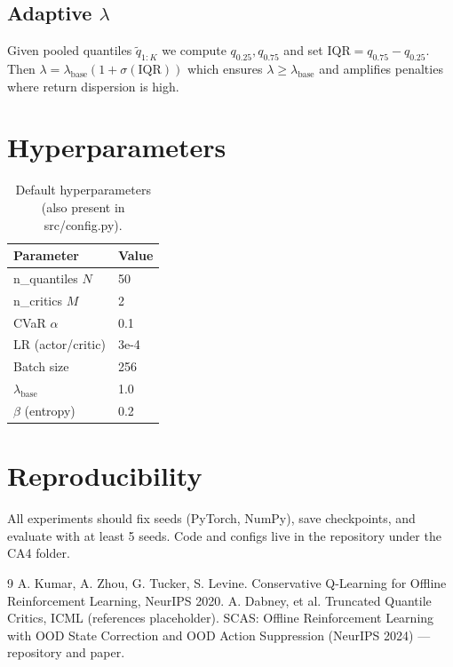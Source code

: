 \documentclass{article}
\begin{document}
\subsection{Adaptive $\lambda$}
Given pooled quantiles $\tilde q_{1:K}$ we compute $q_{0.25}, q_{0.75}$ and set $\mathrm{IQR}=q_{0.75}-q_{0.25}$. Then $\lambda=\lambda_\text{base}(1+\sigma(\mathrm{IQR}))$ which ensures $\lambda\ge\lambda_\text{base}$ and amplifies penalties where return dispersion is high.

\section{Hyperparameters}
\begin{table}[h]
\centering
\begin{tabular}{ll}
\toprule
Parameter & Value \\
\midrule
n\_quantiles $N$ & 50 \\
n\_critics $M$ & 2 \\
CVaR $\alpha$ & 0.1 \\
LR (actor/critic) & 3e-4 \\
Batch size & 256 \\
$\lambda_\text{base}$ & 1.0 \\
$\beta$ (entropy) & 0.2 \\
\bottomrule
\end{tabular}
\caption{Default hyperparameters (also present in src/config.py).}
\end{table}

\section{Reproducibility}
All experiments should fix seeds (PyTorch, NumPy), save checkpoints, and evaluate with at least 5 seeds. Code and configs live in the repository under the CA4 folder.


\begin{thebibliography}{9}
 A. Kumar, A. Zhou, G. Tucker, S. Levine. Conservative Q-Learning for Offline Reinforcement Learning, NeurIPS 2020.
 A. Dabney, et al. Truncated Quantile Critics, ICML (references placeholder).
 SCAS: Offline Reinforcement Learning with OOD State Correction and OOD Action Suppression (NeurIPS 2024) — repository and paper.
\end{thebibliography}
\end{document}
